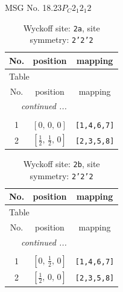 \documentclass[fleqn,8pt]{jsarticle}
\begin{document}
\setcounter{MaxMatrixCols}{32}

\renewcommand{\tablename}{Table~}
\renewcommand{\figurename}{Figure~}
\begin{center}
\LARGE
MSG No. 18.23\quad$P_{C}2_{1}2_{1}2$
\end{center}
\renewcommand{\arraystretch}{1.2}
\begin{longtable}{ccc}
\caption{Wyckoff site: {\tt 2a}, site symmetry: {\tt 2'2'2}}
 \\
 \hline \hline
No. & position & mapping \\ \hline \endfirsthead

\multicolumn{2}{l}{\tablename\ \thetable{}} \\
 \hline \hline
No. & position & mapping \\ \hline \endhead

 \hline \hline
\multicolumn{2}{r}{\footnotesize\it continued ...} \\ \endfoot

 \hline \hline
\multicolumn{2}{r}{} \\ \endlastfoot

1 & $\left[ 0,\, 0,\, 0 \right]$ & {\tt [1,4,6,7]} \\ \hline
2 & $\left[ \frac{1}{2},\, \frac{1}{2},\, 0 \right]$ & {\tt [2,3,5,8]} \\
\end{longtable}
\renewcommand{\arraystretch}{1.2}
\begin{longtable}{ccc}
\caption{Wyckoff site: {\tt 2b}, site symmetry: {\tt 2'2'2}}
 \\
 \hline \hline
No. & position & mapping \\ \hline \endfirsthead

\multicolumn{2}{l}{\tablename\ \thetable{}} \\
 \hline \hline
No. & position & mapping \\ \hline \endhead

 \hline \hline
\multicolumn{2}{r}{\footnotesize\it continued ...} \\ \endfoot

 \hline \hline
\multicolumn{2}{r}{} \\ \endlastfoot

1 & $\left[ 0,\, \frac{1}{2},\, 0 \right]$ & {\tt [1,4,6,7]} \\ \hline
2 & $\left[ \frac{1}{2},\, 0,\, 0 \right]$ & {\tt [2,3,5,8]} \\
\end{longtable}
\renewcommand{\arraystretch}{1.2}
\end{document}
